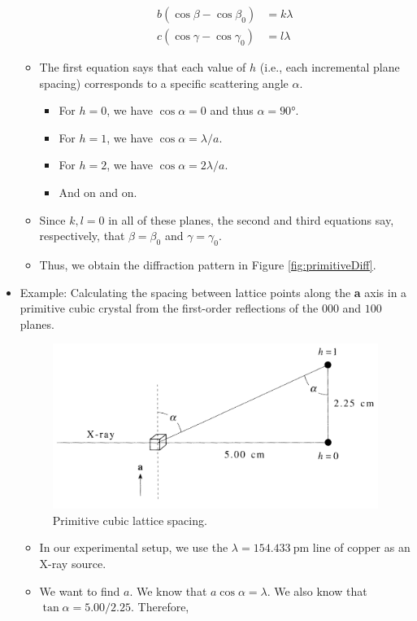 \documentclass[../notes.tex]{subfiles}
\begin{document}
\begin{itemize}
\begin{itemize}
\begin{align*}
            b(\cos\beta-\cos\beta_0) &= k\lambda\\
            c(\cos\gamma-\cos\gamma_0) &= l\lambda
        \end{align*}
        \item The first equation says that each value of $h$ (i.e., each incremental plane spacing) corresponds to a specific scattering angle $\alpha$.
        \begin{itemize}
            \item For $h=0$, we have $\cos\alpha=0$ and thus $\alpha=\ang{90}$.
            \item For $h=1$, we have $\cos\alpha=\lambda/a$.
            \item For $h=2$, we have $\cos\alpha=2\lambda/a$.
            \item And on and on.
        \end{itemize}
        \item Since $k,l=0$ in all of these planes, the second and third equations say, respectively, that $\beta=\beta_0$ and $\gamma=\gamma_0$.
        \item Thus, we obtain the diffraction pattern in Figure \ref{fig:primitiveDiff}.
    \end{itemize}
    \item Example: Calculating the spacing between lattice points along the \textbf{a} axis in a primitive cubic crystal from the first-order reflections of the $000$ and $100$ planes.
    \begin{figure}[h!]
        \centering
        \includegraphics[width=0.55\linewidth]{../ExtFiles/primitiveLatticeSpace.png}
        \caption{Primitive cubic lattice spacing.}
        \label{fig:primitiveLatticeSpace}
    \end{figure}
    \begin{itemize}
        \item In our experimental setup, we use the $\lambda=\SI{154.433}{\pico\meter}$ line of copper as an X-ray source.
        \item We want to find $a$. We know that $a\cos\alpha=\lambda$. We also know that $\tan\alpha=5.00/2.25$. Therefore,

\end{itemize}
\end{itemize}
\end{document}
